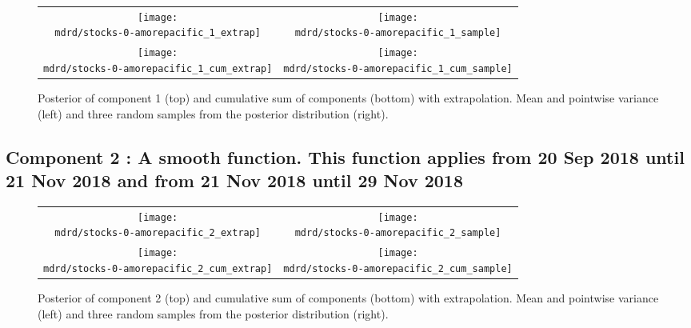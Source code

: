 \documentclass{article} %
\begin{document}


\begin{figure}[H]
\newcommand{\wmgd}{0.5\columnwidth}
\newcommand{\hmgd}{3.0cm}
\newcommand{\mdrd}{stocks-0-amorepacific}
\newcommand{\mbm}{\hspace{-0.3cm}}
\begin{tabular}{cc}
\mbm \texttt{[image: \\mdrd/stocks-0-amorepacific\_1\_extrap]} & \texttt{[image: \\mdrd/stocks-0-amorepacific\_1\_sample]} \\
\mbm \texttt{[image: \\mdrd/stocks-0-amorepacific\_1\_cum\_extrap]} & \texttt{[image: \\mdrd/stocks-0-amorepacific\_1\_cum\_sample]}
\end{tabular}
\caption{Posterior of component 1 (top) and cumulative sum of components (bottom) with extrapolation. Mean and pointwise variance (left) and three random samples from the posterior distribution (right).}
\label{fig:extrap1}
\end{figure}

\subsection{Component 2 : A smooth function. This function applies from 20 Sep 2018 until 21 Nov 2018 and from 21 Nov 2018 until 29 Nov 2018}



\begin{figure}[H]
\newcommand{\wmgd}{0.5\columnwidth}
\newcommand{\hmgd}{3.0cm}
\newcommand{\mdrd}{stocks-0-amorepacific}
\newcommand{\mbm}{\hspace{-0.3cm}}
\begin{tabular}{cc}
\mbm \texttt{[image: \\mdrd/stocks-0-amorepacific\_2\_extrap]} & \texttt{[image: \\mdrd/stocks-0-amorepacific\_2\_sample]} \\
\mbm \texttt{[image: \\mdrd/stocks-0-amorepacific\_2\_cum\_extrap]} & \texttt{[image: \\mdrd/stocks-0-amorepacific\_2\_cum\_sample]}
\end{tabular}
\caption{Posterior of component 2 (top) and cumulative sum of components (bottom) with extrapolation. Mean and pointwise variance (left) and three random samples from the posterior distribution (right).}
\label{fig:extrap2}
\end{figure}
\end{document}
